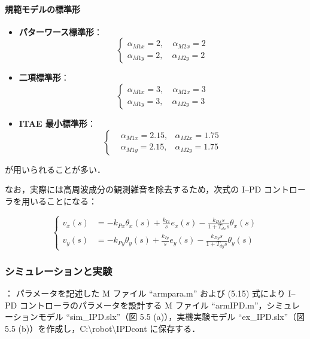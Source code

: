 \paragraph{規範モデルの標準形}
\begin{itemize}
    \item \textbf{パターワース標準形}：
    \[
    \left\{
    \begin{aligned}
        \alpha_{M1x} = 2, \quad \alpha_{M2x} = 2 \\
        \alpha_{M1y} = 2, \quad \alpha_{M2y} = 2
    \end{aligned}
    \right.
    \]
    
    \item \textbf{二項標準形}：
    \[
    \left\{
    \begin{aligned}
        \alpha_{M1x} = 3, \quad \alpha_{M2x} = 3 \\
        \alpha_{M1y} = 3, \quad \alpha_{M2y} = 3
    \end{aligned}
    \right.
    \]
    
    \item \textbf{ITAE 最小標準形}：
    \[
    \left\{
    \begin{aligned}
        &\alpha_{M1x} = 2.15, &\alpha_{M2x} = 1.75\\
        &\alpha_{M1y} = 2.15, &\alpha_{M2y} = 1.75
    \end{aligned}
    \right.
    \]
\end{itemize}

\noindent
が用いられることが多い．

\bigskip

\noindent
なお，実際には高周波成分の観測雑音を除去するため，次式の I--PD コントローラを用いることになる：

\begin{equation}
\left\{
\begin{aligned}
v_x(s) &= -k_{Px} \theta_x(s) + \frac{k_{Ix}}{s} e_x(s) - \frac{k_{Dx}s}{1 + T_{dx}s} \theta_x(s) \\
v_y(s) &= -k_{Py} \theta_y(s) + \frac{k_{Iy}}{s} e_y(s) - \frac{k_{Dy}s}{1 + T_{dy}s} \theta_y(s)
\end{aligned}
\right.
\tag{5.16}
\end{equation}

\subsubsection{シミュレーションと実験}
：
パラメータを記述した M ファイル ``armpara.m'' および (5.15) 式により I--PD コントローラのパラメータを設計する M ファイル ``armIPD.m''，シミュレーションモデル ``sim\_IPD.slx''（図 5.5 (a)），実機実験モデル ``ex\_IPD.slx''（図 5.5 (b)）を作成し，C:\textbackslash robot\textbackslash IPDcont に保存する．


